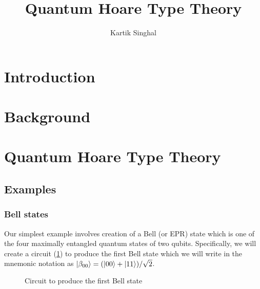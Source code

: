 \documentclass[adraft,creativecommons]{eptcs}
\title{Quantum Hoare Type Theory}
\author{
Kartik Singhal
\institute{University of Chicago}
\email{\mailtodomain{ks@cs.uchicago.edu}}
}
\begin{document}
\maketitle

\section{Introduction}

\section{Background}

\section{Quantum Hoare Type Theory}

\subsection{Examples}

\subsubsection{Bell states}

Our simplest example involves creation of a Bell (or EPR) state which is one of the four maximally entangled quantum states of two qubits. Specifically, we will create a circuit (\cref{fig:bell00}) to produce the first Bell state which we will write in the mnemonic notation as $\ket{\beta_{00}} = (\ket{00}+\ket{11})/\sqrt{2}$.

\begin{figure}
    \centering
    \caption{Circuit to produce the first Bell state}
    \label{fig:bell00}
\end{figure}
\end{document}

